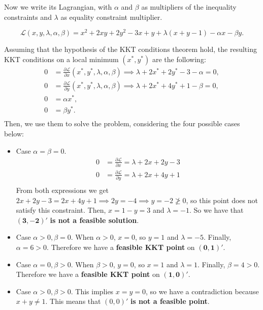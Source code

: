 \documentclass[12pt]{scrartcl}
\begin{document}
Now we write its Lagrangian, with $\alpha$ and $\beta$ as multipliers of the inequality constraints and $\lambda$ as equality constraint multiplier. 


\begin{equation*}
    \mathcal{L}(x, y, \lambda, \alpha, \beta) = x^2 + 2xy + 2y^2 -3x + y + \lambda(x + y -1) - \alpha x - \beta y.
\end{equation*}

\vspace{0.5em}

Assuming that the hypothesis of the KKT conditions theorem hold, the resulting KKT conditions on a local minimum $(x^\ast, y^\ast)$ are the following:
\begin{align*}
    0 &= \frac{\partial \mathcal{L}}{\partial x} (x^\ast, y^\ast, \lambda, \alpha, \beta) \implies \lambda + 2x^\ast + 2y^\ast -3 - \alpha = 0,\\
    0 &= \frac{\partial \mathcal{L}}{\partial y} (x^\ast, y^\ast, \lambda, \alpha, \beta) \implies \lambda + 2x^\ast + 4y^\ast + 1 - \beta = 0,\\
    0 &= \alpha x^\ast ,\\
    0 &= \beta y^\ast .\\
\end{align*}
Then, we use them to solve the problem, considering the four possible cases below:
\begin{itemize}
    \item Case $\alpha = \beta = 0$.
    \begin{align*}
        0 &= \frac{\partial \mathcal{L}}{\partial x} = \lambda + 2x + 2y -3 \\
        0 &= \frac{\partial \mathcal{L}}{\partial y} = \lambda + 2x + 4y + 1 \\
    \end{align*}
    From both expressions we get $2x + 2y -3 = 2x + 4y +1 \implies 2y = -4 \implies y = -2 \ngeq 0$, so this point does not satisfy this constraint. Then, $x = 1-y = 3$ and $\lambda=-1$. So we have that $\mathbf{(3, -2)'}$ \textbf{is not a feasible solution}.
    \item Case $\alpha > 0, \beta = 0$.
    When $\alpha > 0$, $x=0$, so $y=1$ and $\lambda=-5$. Finally, $\alpha = 6 > 0$. Therefore we have a \textbf{feasible KKT point} on $\mathbf{(0, 1)'}$.
    \item Case $\alpha = 0, \beta > 0$.
    When $\beta > 0$, $y=0$, so $x=1$ and $\lambda=1$. Finally, $\beta = 4 > 0$. Therefore we have a \textbf{feasible KKT point} on $\mathbf{(1, 0)'}$.
    \item Case $\alpha > 0, \beta > 0$.
    This implies $x=y=0$, so we have a contradiction because $x + y \neq 1$. This means that $(0,0)'$ \textbf{is not a feasible point}.
\end{itemize}
\end{document}
